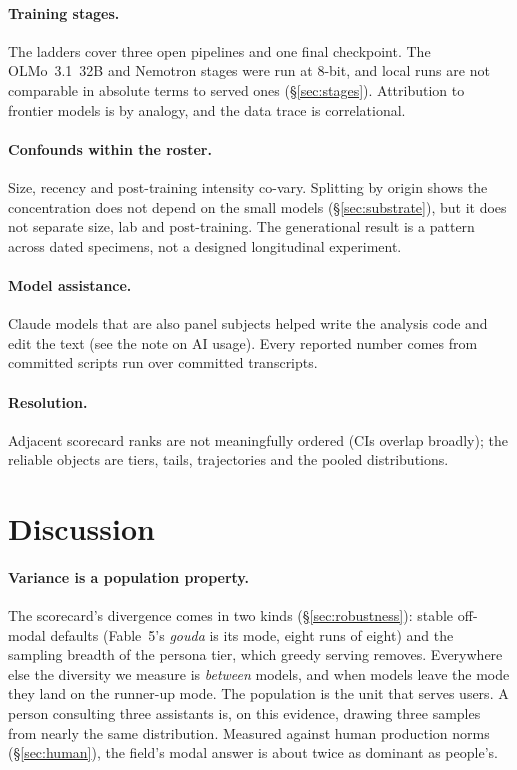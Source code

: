 \documentclass[11pt]{article}
\begin{document}
\paragraph{Training stages.} The ladders cover three open pipelines and one final checkpoint. The OLMo~3.1~32B and Nemotron stages were run at 8-bit, and local runs are not comparable in absolute terms to served ones (\S\ref{sec:stages}). Attribution to frontier models is by analogy, and the data trace is correlational.

\paragraph{Confounds within the roster.} Size, recency and post-training intensity co-vary. Splitting by origin shows the concentration does not depend on the small models (\S\ref{sec:substrate}), but it does not separate size, lab and post-training. The generational result is a pattern across dated specimens, not a designed longitudinal experiment.

\paragraph{Model assistance.} Claude models that are also panel subjects helped write the analysis code and edit the text (see the note on AI usage). Every reported number comes from committed scripts run over committed transcripts.

\paragraph{Resolution.} Adjacent scorecard ranks are not meaningfully ordered (CIs overlap broadly); the reliable objects are tiers, tails, trajectories and the pooled distributions.

\section{Discussion}
\label{sec:discussion}

\paragraph{Variance is a population property.}
The scorecard's divergence comes in two kinds (\S\ref{sec:robustness}): stable off-modal defaults (Fable~5's \emph{gouda} is its mode, eight runs of eight) and the sampling breadth of the persona tier, which greedy serving removes. Everywhere else the diversity we measure is \emph{between} models, and when models leave the mode they land on the runner-up mode. The population is the unit that serves users. A person consulting three assistants is, on this evidence, drawing three samples from nearly the same distribution. Measured against human production norms (\S\ref{sec:human}), the field's modal answer is about twice as dominant as people's.
\end{document}
